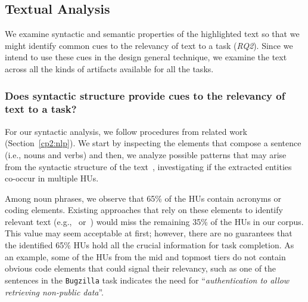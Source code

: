 
\subsection{Textual Analysis}


We examine syntactic and semantic properties 
of the highlighted text so that 
we might identify
common cues to the relevancy of text to a task (\textit{RQ2}).
Since we intend to use these cues 
in the design general technique, 
we examine the text across 
all the kinds of artifacts 
available for all the tasks. 




 





\subsubsection{Does syntactic structure provide cues to the relevancy of text to a task?}
\label{cp3:syntactic-analysis}


For our syntactic analysis, we follow procedures from related work (Section~\ref{cp2:nlp}).
We start by inspecting the elements that compose a sentence (i.e., nouns and verbs)
and then, we analyze possible patterns that may arise from the syntactic structure of the text~\cite{Robillard2015},
investigating if the extracted entities co-occur in multiple HUs.






Among noun phrases, we observe that 65\% of the HUs contain acronyms or coding elements.
Existing approaches that rely on these elements to identify relevant text (e.g.,~\cite{Robillard2015} or~\cite{Jiang2016b}) would miss the remaining 35\% of the HUs in our corpus.
This value may seem acceptable at first; however, there are no guarantees that
the identified 65\% HUs hold all the crucial information for task completion.
As an example, some of the HUs from the mid and topmost tiers 
do not contain obvious code elements that could signal their relevancy,
such as one of the sentences in the \texttt{Bugzilla} task indicates the need for ``\textit{authentication to allow retrieving non-public data}''.





